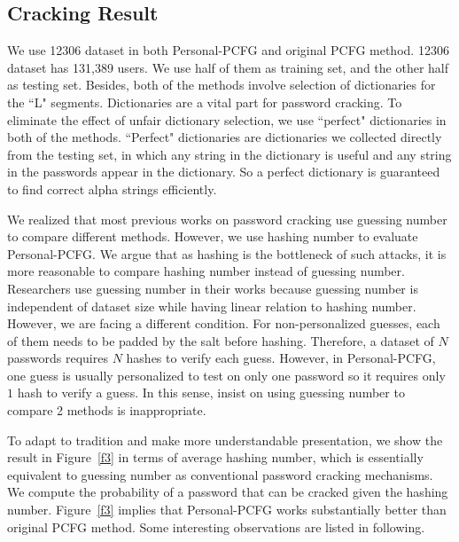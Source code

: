 \subsection{Cracking Result}
We use 12306 dataset in both Personal-PCFG and original PCFG method. 12306 dataset has 131,389 users. We use half of them as training set, and the other half as testing set. Besides, both of the methods involve selection of dictionaries for the ``L" segments. Dictionaries are a vital part for password cracking. To eliminate the effect of unfair dictionary selection, we use ``perfect" dictionaries in both of the methods. ``Perfect" dictionaries are dictionaries we collected directly from the testing set, in which any string in the dictionary is useful and any string in the passwords appear in the dictionary. So a perfect dictionary is guaranteed to find correct alpha strings efficiently.

We realized that most previous works on password cracking use guessing number to compare different methods. However, we use hashing number to evaluate Personal-PCFG. We argue that as hashing is the bottleneck of such attacks, it is more reasonable to compare hashing number instead of guessing number. Researchers use guessing number in their works because guessing number is independent of dataset size while having linear relation to hashing number. However, we are facing a different condition. For non-personalized guesses, each of them needs to be padded by the salt before hashing. Therefore, a dataset of $N$ passwords requires $N$ hashes to verify each guess. However, in Personal-PCFG, one guess is usually personalized to test on only one password so it requires only $1$ hash to verify a guess. In this sense, insist on using guessing number to compare 2 methods is inappropriate.

To adapt to tradition and make more understandable presentation, we show the result in Figure~\ref{f3} in terms of average hashing number, which is essentially equivalent to guessing number as conventional password cracking mechanisms. We compute the probability of a password that can be cracked given the hashing number. Figure~\ref{f3} implies that Personal-PCFG works substantially better than original PCFG method. Some interesting observations are listed in following.


